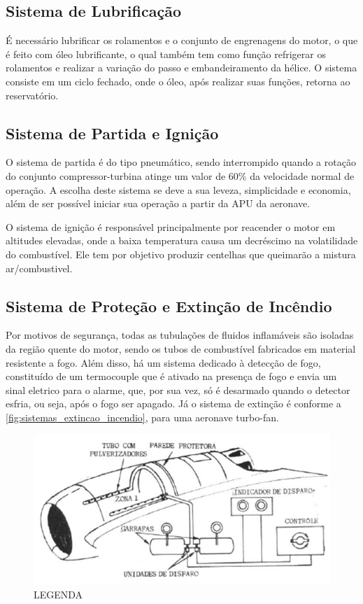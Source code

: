 \subsection{Sistema de Lubrificação}

É necessário lubrificar os rolamentos e o conjunto de engrenagens do motor, o que é feito com óleo lubrificante, o qual também tem como função refrigerar os rolamentos e realizar a variação do passo e embandeiramento da hélice.
O sistema consiste em um ciclo fechado, onde o óleo, após realizar suas funções, retorna ao reservatório.

\subsection{Sistema de Partida e Ignição}

O sistema de partida é do tipo pneumático, sendo interrompido quando a rotação do conjunto compressor-turbina atinge um valor de 60\% da velocidade normal de operação.
A escolha deste sistema se deve a sua leveza, simplicidade e economia, além de ser possível iniciar sua operação a partir da APU da aeronave.

O sistema de ignição é responsável principalmente por reacender o motor em altitudes elevadas, onde a baixa temperatura causa um decréscimo na volatilidade do combustível.
Ele tem por objetivo produzir centelhas que queimarão a mistura ar/combustivel.

\subsection{Sistema de Proteção e Extinção de Incêndio}

Por motivos de segurança, todas as tubulações de fluidos inflamáveis são isoladas da região quente do motor, sendo os tubos de combustível fabricados em material resistente a fogo.
Além disso, há um sistema dedicado à detecção de fogo, constituído de um termocouple que é ativado na presença de fogo e envia um sinal eletrico para o alarme, que, por sua vez, só é desarmado quando o detector esfria, ou seja, após o fogo ser apagado.
Já o sistema de extinção é conforme a \autoref{fig:sistemas_extincao_incendio}, para uma aeronave turbo-fan.

\begin{figure}
\includegraphics[width=\textwidth]{images/parte3/sistemas_extincao_incendio.png}
\caption{LEGENDA}
\label{fig:sistemas_extincao_incendio}
\end{figure}


